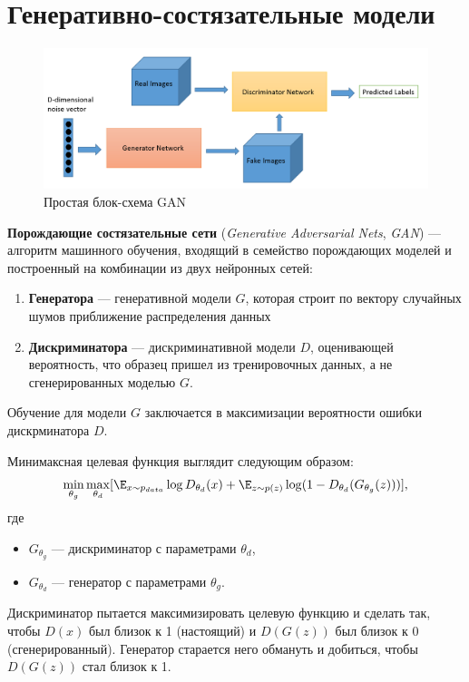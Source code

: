 \section{Генеративно-состязательные модели}

\begin{figure}[h]
    \centering
    \includegraphics[width=\textwidth]{images/gan.png}
    \caption{Простая блок-схема GAN}
\end{figure}

\begin{definition}
    \textbf{Порождающие состязательные сети} (\textit{Generative Adversarial Nets}, \textit{GAN}) — алгоритм машинного обучения, входящий в семейство порождающих моделей и построенный на комбинации из двух нейронных сетей:
    \begin{enumerate}
        \item \textbf{Генератора} --- генеративной модели $G$, которая строит по вектору случайных шумов приближение распределения данных
        \item \textbf{Дискриминатора} --- дискриминативной модели $D$, оценивающей вероятность, что образец пришел из тренировочных данных, а не сгенерированных моделью $G$.
    \end{enumerate}
    Обучение для модели $G$ заключается в максимизации вероятности ошибки дискрминатора $D$.
\end{definition}

Минимаксная целевая функция выглядит следующим образом:
\[
    \min_{\theta_g}\max_{\theta_d}[\E_{x\sim p_{data}}\log D_{\theta_d}(x)+\E_{z\sim p(z)}\log(1-D_{\theta_d}(G_{\theta_g}(z)))],
\]
где
\begin{itemize}
    \item $G_{\theta_g}$ --- дискриминатор с параметрами $\theta_d$,
    \item $G_{\theta_d}$ --- генератор с параметрами $\theta_g$.
\end{itemize}

\begin{remark}
    Дискриминатор пытается максимизировать целевую функцию и сделать так, чтобы $D(x)$ был близок к 1 (настоящий) и $D(G(z))$ был близок к 0 (сгенерированный). Генератор старается него обмануть и добиться, чтобы $D(G(z))$ стал близок к 1.
\end{remark}

